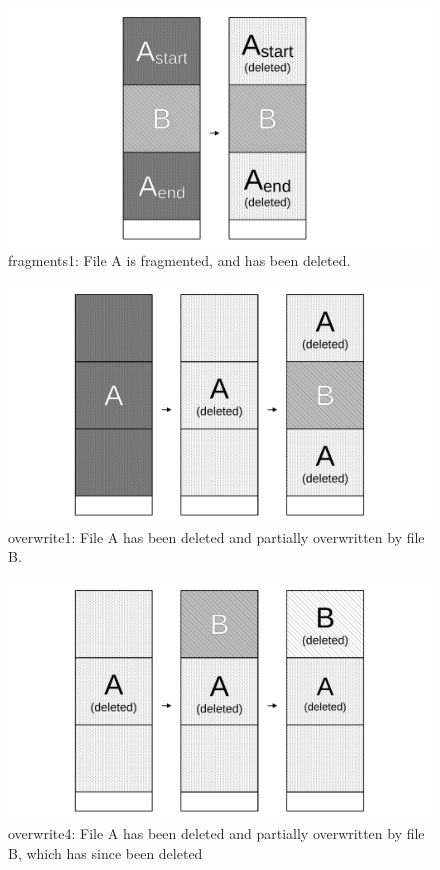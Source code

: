 \begin{figure}
    \centering
    \includegraphics[width=\linewidth]{fig/case2.pdf}
    \caption{fragments1: File A is fragmented, and has been deleted.}
    \label{fig:case2}
\end{figure}

\begin{figure}
    \centering
    \includegraphics[width=\linewidth]{fig/case5.pdf}
    \caption{overwrite1: File A has been deleted and partially overwritten by file B.}
    \label{fig:case5}
\end{figure}

 \begin{figure}[h]
    \centering
    \includegraphics[width=\linewidth]{fig/case8.pdf}
    \caption{overwrite4: File A has been deleted and partially overwritten by file B, which has since been deleted}
    \label{fig:case8}
\end{figure}

